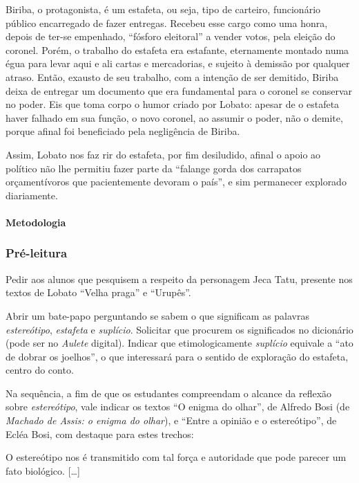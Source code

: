 \documentclass[12pt]{extarticle}
\begin{document}
Biriba, o protagonista, é um estafeta, ou seja, tipo de carteiro,
funcionário público encarregado de fazer entregas. Recebeu esse cargo
como uma honra, depois de ter-se empenhado, ``fósforo eleitoral'' a
vender votos, pela eleição do coronel. Porém, o trabalho do estafeta era
estafante, eternamente montado numa égua para levar aqui e ali cartas e
mercadorias, e sujeito à demissão por qualquer atraso. Então, exausto de
seu trabalho, com a intenção de ser demitido, Biriba deixa de entregar
um documento que era fundamental para o coronel se conservar no poder.
Eis que toma corpo o humor criado por Lobato: apesar de o estafeta haver
falhado em sua função, o novo coronel, ao assumir o poder, não o demite,
porque afinal foi beneficiado pela negligência de Biriba.

Assim, Lobato nos faz rir do estafeta, por fim desiludido, afinal o
apoio ao político não lhe permitiu fazer parte da ``falange gorda dos
carrapatos orçamentívoros que pacientemente devoram o país'', e sim
permanecer explorado diariamente.

\paragraph{Metodologia}

\subsubsection{Pré-leitura}

Pedir aos alunos que pesquisem a respeito da personagem Jeca Tatu,
presente nos textos de Lobato ``Velha praga'' e ``Urupês''.

Abrir um bate-papo perguntando se sabem o que significam as palavras
\emph{estereótipo}, \emph{estafeta} e \emph{suplício}. Solicitar que
procurem os significados no dicionário (pode ser no \emph{Aulete}
digital). Indicar que etimologicamente \emph{suplício} equivale a ``ato
de dobrar os joelhos'', o que interessará para o sentido de exploração
do estafeta, centro do conto.

Na sequência, a fim de que os estudantes compreendam o alcance da
reflexão sobre \emph{estereótipo}, vale indicar os textos ``O enigma do
olhar'', de Alfredo Bosi (de \emph{Machado de Assis: o enigma do
olhar}), e ``Entre a opinião e o estereótipo'', de Ecléa Bosi, com
destaque para estes trechos:

O estereótipo nos é transmitido com tal força e autoridade que pode
parecer um fato biológico. {[}\ldots{}{]}
\end{document}
